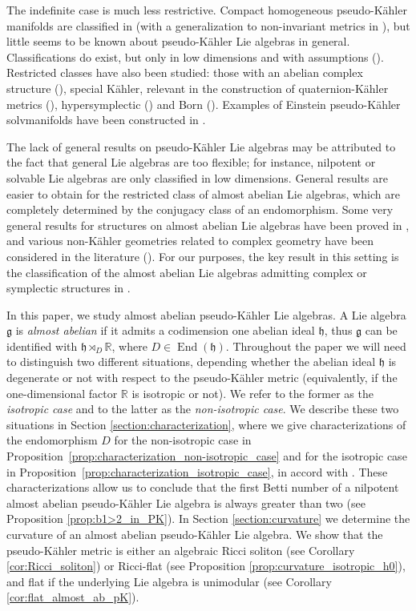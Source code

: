\documentclass{article}
\theoremstyle{definition}
\DeclareMathOperator{\End}{End}
\newcommand{\R}{\mathbb{R}}
\newcommand{\frg}{\mathfrak{g}}
\newcommand{\frh}{\mathfrak{h}}
\begin{document}
The indefinite case is much less restrictive. Compact homogeneous pseudo-Kähler manifolds are classified in \cite{DG92} (with a generalization to non-invariant metrics in \cite{Guan10}), but little seems to be known about pseudo-Kähler Lie algebras in general. Classifications do exist, but only in low dimensions and with assumptions (\cite{Ova06,CFU04,LU25,CG25}). Restricted classes have also been studied: those with an abelian complex structure (\cite{BS12}), special Kähler, relevant in the construction of quaternion-Kähler metrics (\cite{Valencia,Man21,Ac00}), hypersymplectic (\cite{AD06,And06,BGL21}) and Born (\cite{BornGeometry25,BornLieAlgebras25}). Examples of Einstein pseudo-Kähler solvmanifolds have been constructed in \cite{Yamada12,Conti_Rossi_SegnanDalmasso_2023,Rossi:NewSpecialFantastic}.\medskip

The lack of general results on pseudo-Kähler Lie algebras may be attributed to the fact that general Lie algebras are too flexible; for instance, nilpotent or solvable Lie algebras are only classified in low dimensions. General results are easier to obtain for the restricted class of almost abelian Lie algebras, which are completely determined by the conjugacy class of an endomorphism. Some very general results for structures on almost abelian Lie algebras have been proved in \cite{Freibert24_TFHS}, and various non-Kähler geometries related to complex geometry have been considered in the literature (\cite{Paradiso21,BFLT23,FP21,FP23}). For our purposes, the key result in this setting is the classification of the almost abelian Lie algebras admitting complex or symplectic structures in \cite{ArroyoBarberisDiazGodoyHernandez}.\medskip

In this paper, we study almost abelian pseudo-Kähler Lie algebras. A Lie algebra $\frg$ is \emph{almost abelian} if it admits a codimension one abelian ideal $\frh$, thus $\frg$ can be identified with $\frh\rtimes_D\R$, where $D\in\End(\frh)$. Throughout the paper we will need to distinguish two different situations, depending whether the abelian ideal $\frh$ is degenerate or not with respect to the pseudo-Kähler metric (equivalently, if the one-dimensional factor $\R$ is isotropic or not). We refer to the former as the \emph{isotropic case} and to the latter as the \emph{non-isotropic case}. We describe these two situations in Section \ref{section:characterization}, where we give characterizations of the endomorphism $D$ for the non-isotropic case in Proposition~\ref{prop:characterization_non-isotropic_case} and for the isotropic case in Proposition~\ref{prop:characterization_isotropic_case}, in accord with \cite{Freibert24_TFHS}. These characterizations allow us to conclude that the first Betti number of a nilpotent almost abelian pseudo-Kähler Lie algebra is always greater than two (see Proposition \ref{prop:b1>2_in_PK}). In Section \ref{section:curvature} we determine the curvature of an almost abelian pseudo-Kähler Lie algebra. We show that the pseudo-Kähler metric is either an algebraic Ricci soliton (see Corollary \ref{cor:Ricci_soliton}) or Ricci-flat (see Proposition \ref{prop:curvature_isotropic_h0}), and flat if the underlying Lie algebra is unimodular (see Corollary \ref{cor:flat_almost_ab_pK}).\medskip
\end{document}
